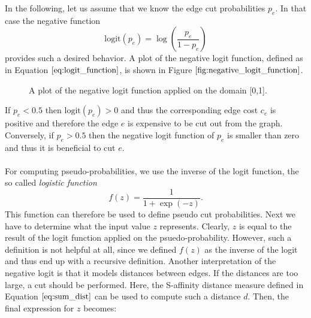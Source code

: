 In the following, let us assume that we know the edge cut probabilities $p_e$. In that case the negative function
\begin{equation}
	\text{logit}\left( p_e \right) = \log \left( \frac{p_e}{1 - p_e} \right)
	\label{eq:logit_function}
\end{equation}
provides such a desired behavior. A plot of the negative logit function, defined as in Equation $\ref{eq:logit_function}$, is shown in Figure $\ref{fig:negative_logit_function}$.
\begin{figure}[H]
\centering
{}
\caption[Logit Function Plot]{A plot of the negative logit function applied on the domain [0,1].}
\label{fig:negative_logit_function}
\end{figure}
If $p_e < 0.5$ then $\text{logit}\left( p_e \right) > 0$ and thus the corresponding edge cost $c_e$ is positive and therefore the edge $e$ is expensive to be cut out from the graph. Conversely, if $p_e > 0.5$ then the negative logit function of $p_e$ is smaller than zero and thus it is beneficial to cut $e$. \\ \\
For computing pseudo-probabilities, we use the inverse of the logit function, the so called \textit{logistic function}
\begin{equation}
	f(z) = \frac{1}{1 + \exp \left( -z \right)}.
	\label{eq:logistic_function}
\end{equation}
This function can therefore be used to define pseudo cut probabilities. Next we have to determine what the input value $z$ represents. Clearly, $z$ is equal to the result of the logit function applied on the psuedo-probability. However, such a definition is not helpful at all, since we defined $f(z)$ as the inverse of the logit and thus end up with a recursive definition. Another interpretation of the negative logit is that it models distances between edges. If the distances are too large, a cut should be performed. Here, the S-affinity distance measure defined in Equation $\ref{eq:sum_dist}$ can be used to compute such a distance $d$. Then, the final expression for $z$ becomes:
